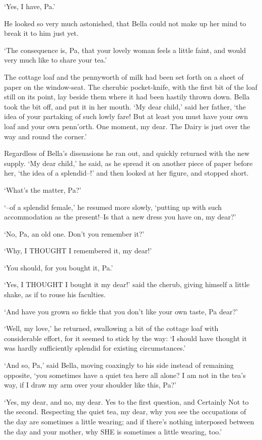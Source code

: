 ‘Yes, I have, Pa.’

He looked so very much astonished, that Bella could not make up her mind
to break it to him just yet.

‘The consequence is, Pa, that your lovely woman feels a little faint,
and would very much like to share your tea.’

The cottage loaf and the pennyworth of milk had been set forth on a
sheet of paper on the window-seat. The cherubic pocket-knife, with the
first bit of the loaf still on its point, lay beside them where it had
been hastily thrown down. Bella took the bit off, and put it in her
mouth. ‘My dear child,’ said her father, ‘the idea of your partaking of
such lowly fare! But at least you must have your own loaf and your own
penn’orth. One moment, my dear. The Dairy is just over the way and round
the corner.’

Regardless of Bella’s dissuasions he ran out, and quickly returned with
the new supply. ‘My dear child,’ he said, as he spread it on another
piece of paper before her, ‘the idea of a splendid--!’ and then looked
at her figure, and stopped short.

‘What’s the matter, Pa?’

‘--of a splendid female,’ he resumed more slowly, ‘putting up with
such accommodation as the present!--Is that a new dress you have on, my
dear?’

‘No, Pa, an old one. Don’t you remember it?’

‘Why, I THOUGHT I remembered it, my dear!’

‘You should, for you bought it, Pa.’

‘Yes, I THOUGHT I bought it my dear!’ said the cherub, giving himself a
little shake, as if to rouse his faculties.

‘And have you grown so fickle that you don’t like your own taste, Pa
dear?’

‘Well, my love,’ he returned, swallowing a bit of the cottage loaf with
considerable effort, for it seemed to stick by the way: ‘I should have
thought it was hardly sufficiently splendid for existing circumstances.’

‘And so, Pa,’ said Bella, moving coaxingly to his side instead of
remaining opposite, ‘you sometimes have a quiet tea here all alone? I
am not in the tea’s way, if I draw my arm over your shoulder like this,
Pa?’

‘Yes, my dear, and no, my dear. Yes to the first question, and Certainly
Not to the second. Respecting the quiet tea, my dear, why you see the
occupations of the day are sometimes a little wearing; and if there’s
nothing interposed between the day and your mother, why SHE is sometimes
a little wearing, too.’

